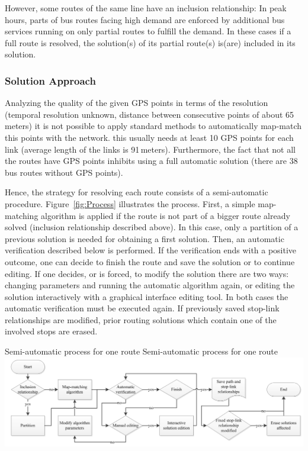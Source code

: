 However, some routes of the same line have an inclusion relationship: In peak hours, parts of bus routes facing high demand are enforced by additional bus services running on only partial routes to fulfill the demand. In these cases if a full route is resolved, the solution(s) of its partial route(s) is(are) included in its solution.

\subsubsection{Solution Approach}

Analyzing the quality of the given GPS points in terms of the resolution (temporal resolution unknown, distance between consecutive points of about 65\,meters) it is not possible to apply standard methods to automatically map-match this points with the network. this usually needs at least 10 GPS points for each link (average length of the links is 91\,meters). Furthermore, the fact that not all the routes have GPS points inhibits using a full automatic solution (there are 38 bus routes without GPS points).

Hence, the strategy for resolving each route consists of a semi-automatic procedure. Figure~\ref{fig:Process} illustrates the process. First, a simple map-matching algorithm is applied if the route is not part of a bigger route already solved (inclusion relationship described above). In this case, only a partition of a previous solution is needed for obtaining a first solution. Then, an automatic verification described below is performed. If the verification ends with a positive outcome, one can decide to finish the route and save the solution or to continue editing. If one decides, or is forced, to modify the solution there are two ways: changing parameters and running the automatic algorithm again, or editing the solution interactively with a graphical interface editing tool. In both cases the automatic verification must be executed again. If previously saved stop-link relationships are modified, prior routing solutions which contain one of the involved stops are erased.

\createfigure
{Semi-automatic process for one route}
{Semi-automatic process for one route}
{\label{fig:Process}}
{\includegraphics[width=1.0\textwidth]{extending/figures/semiAuto/Process.png}}
{}

